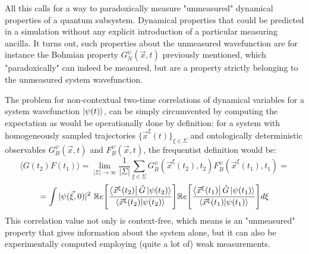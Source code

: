 \documentclass[11pt, a4paper]{article} %
\begin{document}
All this calls for a way to paradoxically measure "unmeasured" dynamical properties of a quantum subsystem. Dynamical properties that could be predicted in a simulation without any explicit introduction of a particular measuring ancilla. It turns out, such properties about the unmeasured wavefunction are for instance the Bohmian property $G^\psi_N(\vec{x},t)$ previously mentioned, which "paradoxically" can indeed be measured, but are a property strictly belonging to the unmeasured system wavefunction.

The problem for non-contextual two-time correlations of dynamical variables for a system wavefunction $\ket{\psi(t)}$, can be simply circumvented by computing the expectation as would be operationally done by definition: for a system with homogeneously sampled trajectories $\{\vec{x}^\xi(t)\}_{\xi\in \Sigma}$ and ontologically deterministic observables $G_B^\psi(\vec{x},t)$ and $F_B^\psi(\vec{x},t)$, the frequentist definition would be:
\begin{equation}
\langle G(t_2)F(t_1)\rangle = \lim_{|\Sigma|\rightarrow \infty}\frac{1}{|\Sigma|} \sum_{\xi\in\Sigma} G_B^\psi(\vec{x}^\xi(t_2),t_2)F_B^\psi(\vec{x}^\xi(t_1),t_1) =
\end{equation}
$$
=  \int |\psi(\vec{\xi},0)|^2\ \mathbb{R}e\qty[ \frac{\bra{\vec{x}^\xi(t_2)}\hat{G}\ket{\psi(t_2)}}{\bra{\vec{x}^\xi(t_2)}\ket{\psi(t_2)}} ] \mathbb{R}e\qty[ \frac{\bra{\vec{x}^\xi(t_1)}\hat{G}\ket{\psi(t_1)}}{\bra{\vec{x}^\xi(t_1)}\ket{\psi(t_1)}} ]d\xi
$$
This correlation value not only is context-free, which means is an "unmeasured" property that gives information about the system alone, but it can also be experimentally computed employing (quite a lot of) weak measurements.
\end{document}

